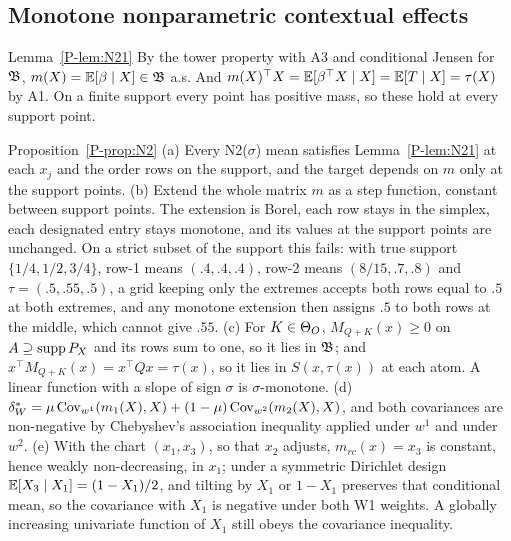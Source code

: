 \subsection{Monotone nonparametric contextual effects}

\begin{proofof}{Lemma~\ref{P-lem:N21}}
By the tower property with A3 and conditional Jensen for $\mathfrak B$,
$m(X)=\mathbb E[\beta\mid X]\in\mathfrak B$ a.s. And $m(X)^\top X=\mathbb E[\beta^\top X\mid X]=\mathbb E[T\mid
X]=\tau(X)$ by A1. On a finite support every point has positive mass, so these hold at
every support point.
\end{proofof}

\begin{proofof}{Proposition~\ref{P-prop:N2}}
(a) Every N2($\sigma$) mean satisfies Lemma~\ref{P-lem:N21} at each $x_j$ and the order
rows on the support, and the target depends on $m$ only at the support points.
(b) Extend the whole matrix $m$ as a step function, constant between support points.
The extension is Borel, each row stays in the simplex, each designated entry stays
monotone, and its values at the support points are unchanged. On a strict subset of
the support this fails: with true support $\{1/4,1/2,3/4\}$, row-1 means $(.4,.4,.4)$,
row-2 means $(8/15,.7,.8)$ and $\tau=(.5,.55,.5)$, a grid keeping only the extremes
accepts both rows equal to $.5$ at both extremes, and any monotone extension then
assigns $.5$ to both rows at the middle, which cannot give $.55$.
(c) For $K\in\Theta_O$, $M_{Q+K}(x)\ge0$ on $A\supseteq\operatorname{supp} P_X$ and its rows sum to one, so it
lies in $\mathfrak B$; and $x^\top M_{Q+K}(x)=x^\top Qx=\tau(x)$, so it lies in $S(x,\tau(x))$ at
each atom. A linear function with a slope of sign $\sigma$ is $\sigma$-monotone.
(d) $\delta^*_W=\mu\operatorname{Cov}_{w^1}(m_1(X),X)+(1-\mu)\operatorname{Cov}_{w^2}(m_2(X),X)$, and both
covariances are non-negative by Chebyshev's association inequality applied under $w^1$
and under $w^2$.
(e) With the chart $(x_1,x_3)$, so that $x_2$ adjusts, $m_{rc}(x)=x_3$ is constant, hence
weakly non-decreasing, in $x_1$; under a symmetric Dirichlet design
$\mathbb E[X_3\mid X_1]=(1-X_1)/2$, and tilting by $X_1$ or $1-X_1$ preserves that conditional
mean, so the covariance with $X_1$ is negative under both W1 weights. A globally
increasing univariate function of $X_1$ still obeys the covariance inequality.
\end{proofof}

